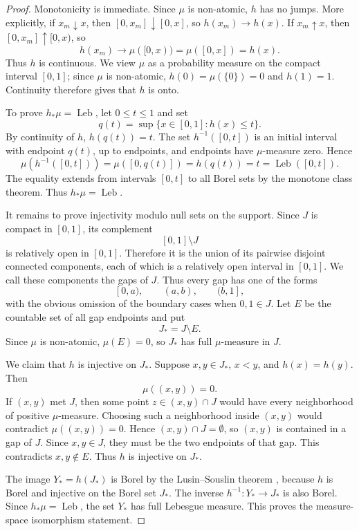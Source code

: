 \documentclass[11pt]{amsart}
\theoremstyle{plain}
\theoremstyle{definition}
\theoremstyle{remark}
\DeclareMathOperator{\Leb}{Leb}
\begin{document}
\begin{proof}
Monotonicity is immediate. Since $\mu$ is non-atomic, $h$ has no jumps. More explicitly, if $x_m\downarrow x$, then $[0,x_m]\downarrow[0,x]$, so $h(x_m)\to h(x)$. If $x_m\uparrow x$, then $[0,x_m]\uparrow[0,x)$, so
\[
        h(x_m)\to\mu([0,x))=\mu([0,x])=h(x).
\]
Thus $h$ is continuous. We view $\mu$ as a probability measure on the compact interval $[0,1]$; since $\mu$ is non-atomic, $h(0)=\mu(\{0\})=0$ and $h(1)=1$. Continuity therefore gives that $h$ is onto.

To prove $h_*\mu=\Leb$, let $0\leq t\leq1$ and set
\[
        q(t)=\sup\{x\in[0,1]:h(x)\leq t\}.
\]
By continuity of $h$, $h(q(t))=t$. The set $h^{-1}([0,t])$ is an initial interval with endpoint $q(t)$, up to endpoints, and endpoints have $\mu$-measure zero. Hence
\[
        \mu(h^{-1}([0,t]))=\mu([0,q(t)])=h(q(t))=t=\Leb([0,t]).
\]
The equality extends from intervals $[0,t]$ to all Borel sets by the monotone class theorem. Thus $h_*\mu=\Leb$.

It remains to prove injectivity modulo null sets on the support. Since \(J\) is compact in \([0,1]\), its complement
\[
        [0,1]\setminus J
\]
is relatively open in \([0,1]\). Therefore it is the union of its
pairwise disjoint connected components, each of which is a relatively
open interval in \([0,1]\). We call these components the gaps of \(J\).
Thus every gap has one of the forms
\[
        [0,a),\qquad
        (a,b),\qquad
        (b,1],
\]
with the obvious omission of the boundary cases when \(0,1\in J\).
Let \(E\) be the countable set of all gap endpoints and put
\[
        J_*=J\setminus E.
\]
Since $\mu$ is non-atomic, $\mu(E)=0$, so $J_*$ has full $\mu$-measure in $J$.

We claim that $h$ is injective on $J_*$. Suppose $x,y\in J_*$, $x<y$, and $h(x)=h(y)$. Then
\[
        \mu((x,y))=0.
\]
If $(x,y)$ met $J$, then some point $z\in (x,y)\cap J$ would have every neighborhood of positive $\mu$-measure. Choosing such a neighborhood inside $(x,y)$ would contradict $\mu((x,y))=0$. Hence $(x,y)\cap J=\emptyset$, so $(x,y)$ is contained in a gap of $J$. Since $x,y\in J$, they must be the two endpoints of that gap. This contradicts $x,y\notin E$. Thus $h$ is injective on $J_*$.

The image $Y_*=h(J_*)$ is Borel by the Lusin--Souslin theorem \cite{Kechris1995}, because $h$ is Borel and injective on the Borel set $J_*$. The inverse $h^{-1}:Y_*\to J_*$ is also Borel. Since $h_*\mu=\Leb$, the set $Y_*$ has full Lebesgue measure. This proves the measure-space isomorphism statement.
\end{proof}
\end{document}
